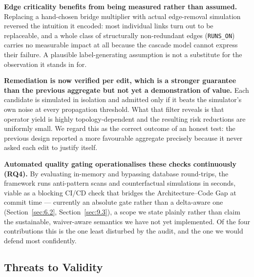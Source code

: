\textbf{Edge criticality benefits from being measured rather than assumed.} Replacing a hand-chosen
bridge multiplier with actual edge-removal simulation reversed the intuition it encoded: most
individual links turn out to be replaceable, and a whole class of structurally non-redundant edges
(\texttt{RUNS\_ON}) carries no measurable impact at all because the cascade model cannot express their
failure. A plausible label-generating assumption is not a substitute for the observation it stands in
for.

\textbf{Remediation is now verified per edit, which is a stronger guarantee than the previous
aggregate but not yet a demonstration of value.} Each candidate is simulated in isolation and
admitted only if it beats the simulator's own noise at every propagation threshold. What that filter
reveals is that operator yield is highly topology-dependent and the resulting risk reductions are
uniformly small. We regard this as the correct outcome of an honest test: the previous design
reported a more favourable aggregate precisely because it never asked each edit to justify itself.

\textbf{Automated quality gating operationalises these checks continuously (RQ4).} By evaluating
in-memory and bypassing database round-trips, the framework runs anti-pattern scans and
counterfactual simulations in seconds, viable as a blocking CI/CD check that bridges the
Architecture--Code Gap at commit time --- currently an absolute gate rather than a delta-aware one
(Section~\ref{sec:6.2}, Section~\ref{sec:9.3}), a scope we state plainly rather than claim the
sustainable, waiver-aware semantics we have not yet implemented. Of the four contributions this is
the one least disturbed by the audit, and the one we would defend most confidently.

\hypertarget{threats-to-validity}{%
\subsection{Threats to Validity}\label{threats-to-validity}}

\label{sec:9.2}

